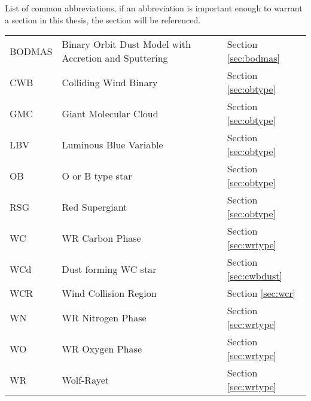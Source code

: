\begin{abbreviations}
List of common abbreviations, if an abbreviation is important enough to warrant a section in this thesis, the section will be referenced.

\begin{table}[h]
  \centering
  \begin{tabular}{l|l|l}
    
    \hline

    BODMAS & Binary Orbit Dust Model with Accretion and Sputtering & Section \ref{sec:bodmas} \\
    CWB & Colliding Wind Binary  & Section \ref{sec:obtype} \\
    GMC & Giant Molecular Cloud & Section \ref{sec:obtype}\\
    LBV & Luminous Blue Variable & Section \ref{sec:obtype} \\
    OB  & O or B type star & Section \ref{sec:obtype} \\ 
    RSG & Red Supergiant & Section \ref{sec:obtype} \\
    WC  & WR Carbon Phase & Section \ref{sec:wrtype} \\
    WCd & Dust forming WC star & Section \ref{sec:cwbdust} \\
    WCR & Wind Collision Region & Section \ref{sec:wcr} \\
    WN  & WR Nitrogen Phase & Section \ref{sec:wrtype} \\
    WO  & WR Oxygen Phase & Section \ref{sec:wrtype} \\
    WR  & Wolf-Rayet & Section \ref{sec:wrtype} \\

    \hline

  \end{tabular} 
  \label{tbl:Abbreviations}
\end{table}



\end{abbreviations}
